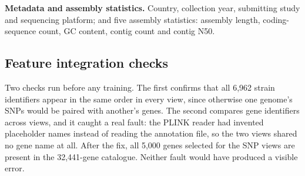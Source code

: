 \textbf{Metadata and assembly statistics.} Country, collection year, submitting study and
sequencing platform; and five assembly statistics: assembly length, coding-sequence count, GC
content, contig count and contig N50.

\subsection*{Feature integration checks}
Two checks run before any training. The first confirms that all 6,962 strain identifiers appear in
the same order in every view, since otherwise one genome's SNPs would be paired with another's
genes. The second compares gene identifiers across views, and it caught a real fault: the PLINK
reader had invented placeholder names instead of reading the annotation file, so the two views
shared no gene name at all. After the fix, all 5,000 genes selected for the SNP views are present
in the 32,441-gene catalogue. Neither fault would have produced a visible error.
